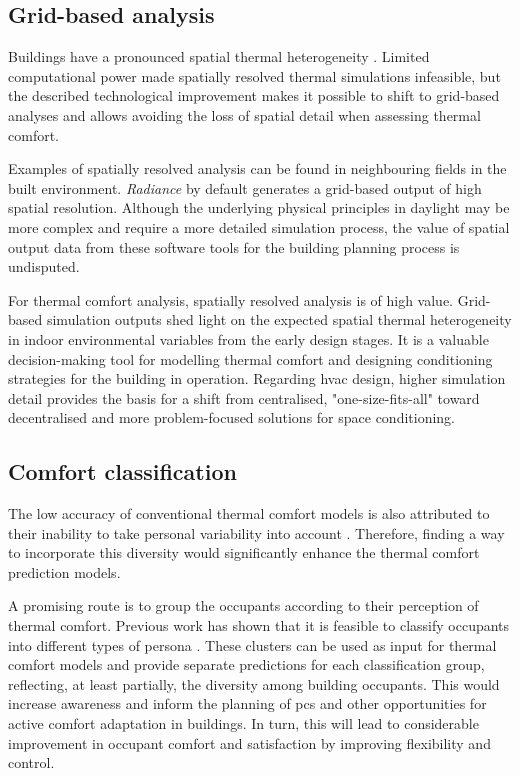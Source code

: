 \subsection{Grid-based analysis}

Buildings have a pronounced spatial thermal heterogeneity \citep{Mishra2016, Clements2019, Kim2019}. Limited computational power made spatially resolved thermal simulations infeasible, but the described technological improvement \citep{Clarke2015} makes it possible to shift to grid-based analyses and allows avoiding the loss of spatial detail when assessing thermal comfort.

Examples of spatially resolved analysis can be found in neighbouring fields in the built environment. \textit{Radiance} \citep{WardRadiance1994} by default generates a grid-based output of high spatial resolution. Although the underlying physical principles in daylight may be more complex and require a more detailed simulation process, the value of spatial output data from these software tools for the building planning process is undisputed. 

For thermal comfort analysis, spatially resolved analysis is of high value. Grid-based simulation outputs shed light on the expected spatial thermal heterogeneity in indoor environmental variables from the early design stages. It is a valuable decision-making tool for modelling thermal comfort and designing conditioning strategies for the building in operation. Regarding \gls{hvac} design, higher simulation detail provides the basis for a shift from centralised, "one-size-fits-all" toward decentralised and more problem-focused solutions for space conditioning.



\subsection{Comfort classification}

The low accuracy of conventional thermal comfort models is also attributed to their inability to take personal variability into account \citep{KimSchiavon2018}. Therefore, finding a way to incorporate this diversity would significantly enhance the thermal comfort prediction models.

A promising route is to group the occupants according to their perception of thermal comfort. Previous work has shown that it is feasible to classify occupants into different types of persona \citep{Lee2017, Gauthier2020, Quintana2023}. These clusters can be used as input for thermal comfort models and provide separate predictions for each classification group, reflecting, at least partially, the diversity among building occupants. This would increase awareness and inform the planning of \gls{pcs} and other opportunities for active comfort adaptation in buildings. In turn, this will lead to considerable improvement in occupant comfort and satisfaction by improving flexibility and control.


